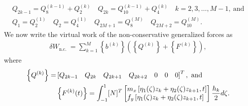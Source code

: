 \documentclass{AeroStructure-ERJohnson}
\begin{document}
\begin{gather}\label{eq18.146}
Q_{2 k-1}=Q_{8}^{(k-1)}+Q_{2}^{(k)} \quad Q_{2 k}=Q_{10}^{(k-1)}+Q_{4}^{(k)} \quad k=2,3, \ldots, M-1,\ \text{and}\\
\label{eq18.147}
Q_{1}=Q_{2}^{(1)} \quad Q_{2}=Q_{4}^{(1)} \quad Q_{2 M+1}=Q_{8}^{(M)} \quad Q_{2 M+2}=Q_{10}^{(M)}.
\end{gather}
We now write the virtual work of the non-conservative generalized forces as
\begin{align}\label{eq18.148}
\delta W_{\text {n.c. }}=\sum_{k=1}^M\left\{b^{(k)}\right\}\left(\left\{Q^{(k)}\right\}+\left\{F^{(k)}\right\}\right),
\end{align}
where
\begin{align}\label{eq18.149}
\left\{Q^{(k)}\right\}=&\left[Q_{2 k-1} \quad Q_{2 k} \quad Q_{2 k+1} \quad Q_{2 k+2}\quad 0 \quad 0 \quad 0\right]^{T},\text{ and }\nonumber\\
&\left\{F^{(k)}(t)\right\}=\int_{-1}^{1}[N]^{T}\left[\begin{array}{@{}l@{}}m_{x}\left[\eta_{1}(\zeta) z_{k}+\eta_{2}(\zeta) z_{k+1}, t\right] \\f_{y}\left[\eta_{1}(\zeta) z_{k}+\eta_{2}(\zeta) z_{k+1}, t\right]\end{array}\right] \frac{h_{k}}{2} d \zeta.
\end{align}
\end{document}
